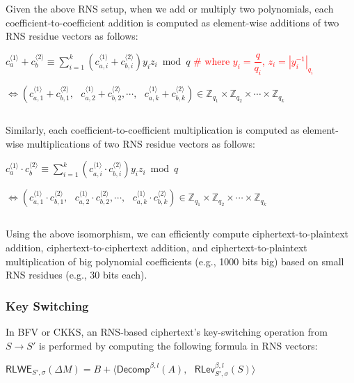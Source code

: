 Given the above RNS setup, when we add or multiply two polynomials, each coefficient-to-coefficient addition is computed as element-wise additions of two RNS residue vectors as follows:

$c^{\langle 1 \rangle}_a + c^{\langle 2 \rangle}_b \equiv \sum\limits_{i=1}^k (c^{\langle 1 \rangle}_{a,i} + c^{\langle 2 \rangle}_{b,i}) y_i z_i \bmod q $ \textcolor{red}{ \# where $y_i = \dfrac{q}{q_i}$, $z_i = |y_i^{-1}|_{q_i}$}

$\Longleftrightarrow (c^{\langle 1 \rangle}_{a,1} + c^{\langle 2 \rangle}_{b,1}, \text{ } c^{\langle 1 \rangle}_{a,2} + c^{\langle 2 \rangle}_{b,2}, \cdots, \text{ } c^{\langle 1 \rangle}_{a,k} + c^{\langle 2 \rangle}_{b,k}) \in \mathbb{Z}_{q_1} \times \mathbb{Z}_{q_2} \times \cdots \times \mathbb{Z}_{q_k}$ 

$ $

Similarly, each coefficient-to-coefficient multiplication is computed as element-wise multiplications of two RNS residue vectors as follows:

$c^{\langle 1 \rangle}_a \cdot c^{\langle 2 \rangle}_b \equiv \sum\limits_{i=1}^k (c^{\langle 1 \rangle}_{a,i} \cdot c^{\langle 2 \rangle}_{b,i}) y_i z_i \bmod q $ 

$\Longleftrightarrow (c^{\langle 1 \rangle}_{a,1} \cdot c^{\langle 2 \rangle}_{b,1}, \text{ } c^{\langle 1 \rangle}_{a,2} \cdot c^{\langle 2 \rangle}_{b,2}, \cdots, \text{ } c^{\langle 1 \rangle}_{a,k} \cdot c^{\langle 2 \rangle}_{b,k}) \in \mathbb{Z}_{q_1} \times \mathbb{Z}_{q_2} \times \cdots \times \mathbb{Z}_{q_k}$

$ $

Using the above isomorphism, we can efficiently compute ciphertext-to-plaintext addition, ciphertext-to-ciphertext addition, and ciphertext-to-plaintext multiplication of big polynomial coefficients (e.g., 1000 bits big) based on small RNS residues (e.g., 30 bits each). 


\subsubsection{Key Switching}
\label{subsubsec:rns-application-key-switching}

In BFV or CKKS, an RNS-based ciphertext's key-switching operation from $S \rightarrow S'$ is performed by computing the following formula in RNS vectors:

$\textsf{RLWE}_{S', \sigma}(\Delta M) = B + \bm{\langle} \textsf{Decomp}^{\beta, l}(A), \text{ } \textsf{RLev}_{S', \sigma}^{\beta, l}(S) \bm{\rangle}$



